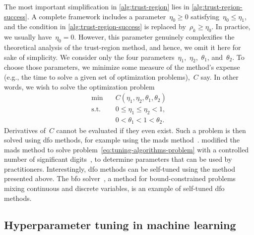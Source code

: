 The most important simplification in \cref{alg:trust-region} lies in \cref{alg:trust-region-success}.
A complete framework includes a parameter~$\eta_0 \ge 0$ satisfying~$\eta_0 \le \eta_1$, and the condition in \cref{alg:trust-region-success} is replaced by~$\rho_k \ge \eta_0$.
In practice, we usually have~$\eta_0 = 0$.
However, this parameter genuinely complexifies the theoretical analysis of the trust-region method, and hence, we omit it here for sake of simplicity.
We consider only the four parameters~$\eta_1$,~$\eta_2$,~$\theta_1$, and~$\theta_2$.
To choose those parameters, we minimize some measure of the method's expense (e.g., the  time to solve a given set of optimization problems),~$C$ say.
In other words, we wish to solve the optimization problem
\begin{subequations}
    \label{eq:tuning-algorithms-problem}
    \begin{align}
        \min        & \quad C(\eta_1, \eta_2, \theta_1, \theta_2)\\
        \text{s.t.} & \quad 0 \le \eta_1 \le \eta_2 < 1,\\
                    & \quad 0 < \theta_1 < 1 < \theta_2.
    \end{align}
\end{subequations}
Derivatives of~$C$ cannot be evaluated if they even exist.
Such a problem is then solved using \gls{dfo} methods, for example using the \gls{mads} method~\cite{Audet_Orban_2006}.
 modified the \gls{mads} method to solve problem~\cref{eq:tuning-algorithms-problem} with a controlled number of significant digits~\cite{Audet_Digabel_Tribes_2019}, to determine parameters that can be used by practitioners.
Interestingly, \gls{dfo} methods can be self-tuned using the method presented above.
The \gls{bfo} solver~\cite{Porcelli_Toint_2017}, a method for bound-constrained problems mixing continuous and discrete variables, is an example of self-tuned \gls{dfo} methods.

\subsection{Hyperparameter tuning in machine learning}
\label{subsec:machine-learning}

